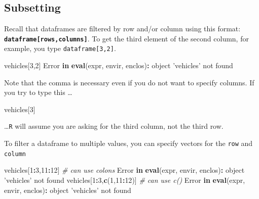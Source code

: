 \documentclass[]{book}
\newenvironment{Shaded}{\begin{snugshade}}{\end{snugshade}}
\newcommand{\CommentTok}[1]{\textcolor[rgb]{0.56,0.35,0.01}{\textit{#1}}}
\newcommand{\ControlFlowTok}[1]{\textcolor[rgb]{0.13,0.29,0.53}{\textbf{#1}}}
\newcommand{\DecValTok}[1]{\textcolor[rgb]{0.00,0.00,0.81}{#1}}
\newcommand{\KeywordTok}[1]{\textcolor[rgb]{0.13,0.29,0.53}{\textbf{#1}}}
\newcommand{\NormalTok}[1]{#1}
\newcommand{\OperatorTok}[1]{\textcolor[rgb]{0.81,0.36,0.00}{\textbf{#1}}}
\newcommand{\StringTok}[1]{\textcolor[rgb]{0.31,0.60,0.02}{#1}}
\begin{document}
\hypertarget{subsetting}{%
\subsection*{Subsetting}\label{subsetting}}

Recall that dataframes are filtered by row and/or column using this format: \textbf{\texttt{dataframe{[}rows,columns{]}}}. To get the third element of the second column, for example, you type \texttt{dataframe{[}3,2{]}}.

\begin{Shaded}
\begin{Highlighting}[]
\NormalTok{vehicles[}\DecValTok{3}\NormalTok{,}\DecValTok{2}\NormalTok{]}
\NormalTok{Error }\ControlFlowTok{in} \KeywordTok{eval}\NormalTok{(expr, envir, enclos)}\OperatorTok{:}\StringTok{ }\NormalTok{object }\StringTok{'vehicles'}\NormalTok{ not found}
\end{Highlighting}
\end{Shaded}

Note that the comma is necessary even if you do not want to specify columns. If you try to type this \ldots{}

\begin{Shaded}
\begin{Highlighting}[]
\NormalTok{vehicles[}\DecValTok{3}\NormalTok{]}
\end{Highlighting}
\end{Shaded}

\ldots{}\texttt{R} will assume you are asking for the third column, not the third row.

To filter a dataframe to multiple values, you can specify vectors for the \texttt{row} and \texttt{column}

\begin{Shaded}
\begin{Highlighting}[]
\NormalTok{vehicles[}\DecValTok{1}\OperatorTok{:}\DecValTok{3}\NormalTok{,}\DecValTok{11}\OperatorTok{:}\DecValTok{12}\NormalTok{] }\CommentTok{# can use colons}
\NormalTok{Error }\ControlFlowTok{in} \KeywordTok{eval}\NormalTok{(expr, envir, enclos)}\OperatorTok{:}\StringTok{ }\NormalTok{object }\StringTok{'vehicles'}\NormalTok{ not found}
\NormalTok{vehicles[}\DecValTok{1}\OperatorTok{:}\DecValTok{3}\NormalTok{,}\KeywordTok{c}\NormalTok{(}\DecValTok{1}\NormalTok{,}\DecValTok{11}\OperatorTok{:}\DecValTok{12}\NormalTok{)]  }\CommentTok{# can use c()}
\NormalTok{Error }\ControlFlowTok{in} \KeywordTok{eval}\NormalTok{(expr, envir, enclos)}\OperatorTok{:}\StringTok{ }\NormalTok{object }\StringTok{'vehicles'}\NormalTok{ not found}
\end{Highlighting}
\end{Shaded}
\end{document}
